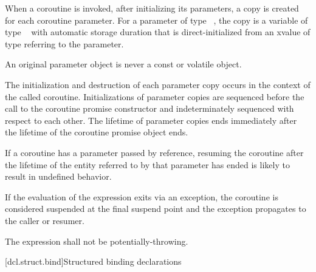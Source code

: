 \pnum
When a coroutine is invoked,
after initializing its parameters,
a copy is created for each coroutine parameter.
For a parameter of type \cv{}~,
the copy is a variable of type \cv{}~
with automatic storage duration that is direct-initialized
from an xvalue of type  referring to the parameter.
\begin{note}
An original parameter object is never
a const or volatile object.
\end{note}
The initialization and destruction of each parameter copy occurs in the
context of the called coroutine.
Initializations of parameter copies are sequenced before the call to the
coroutine promise constructor and indeterminately sequenced with respect to
each other.
The lifetime of parameter copies ends immediately after the lifetime of the
coroutine promise object ends.
\begin{note}
If a coroutine has a parameter passed by reference, resuming the coroutine
after the lifetime of the entity referred to by that parameter has ended is
likely to result in undefined behavior.
\end{note}

\pnum
If the evaluation of the expression
 exits via an exception,
the coroutine is considered suspended at the final suspend point
and the exception propagates to the caller or resumer.

\pnum
The expression  
shall not be potentially-throwing.

[dcl.struct.bind]{Structured binding declarations}%
%
%

